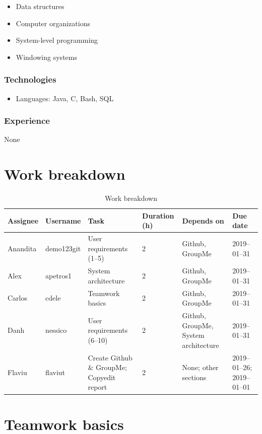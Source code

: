 \documentclass[
10pt, %
a4paper, %
oneside, %
headinclude,footinclude, %
BCOR5mm, %
]{scrartcl}
\begin{document}
\begin{itemize}
\item
  Data structures
\item
  Computer organizations
\item
  System-level programming
\item
  Windowing systems
\end{itemize}

\subsubsection{Technologies}

\begin{itemize}
\item
  Languages: Java, C, Bash, SQL
\end{itemize}

\subsubsection{Experience}

None

\section{Work breakdown}

\begin{table}[H]
\begin{tabular}{@{}llp{3cm}p{1.2cm}p{2cm}p{2cm}@{}}
\toprule
Assignee & Username & Task & Duration (h) & Depends on & Due date\\ \midrule
Anandita & demo123git & User requirements (1--5) & 2 & Github, GroupMe & 2019--01--31\\
Alex & apetros1 & System architecture & 2 & Github, GroupMe & 2019--01--31\\
Carlos & cdele & Teamwork basics & 2 & Github, GroupMe & 2019--01--31\\
Danh & nessico & User requirements (6--10) & 2 & Github, GroupMe, System architecture & 2019--01--31\\
Flaviu & flaviut & Create Github \& GroupMe; Copyedit report & 2 & None; other sections & 2019--01--26; 2019--01--01\\ \bottomrule
\end{tabular}
\caption{Work breakdown}
\end{table}

\section{Teamwork basics}
\end{document}
